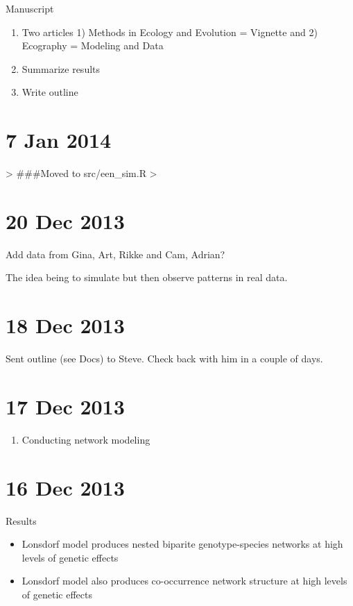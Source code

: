 \documentclass[12pt]{article}
\begin{document}
Manuscript
\begin{enumerate}
\item Two articles 1) Methods in Ecology and Evolution = Vignette and 2)
  Ecography = Modeling and Data
\item Summarize results
\item Write outline
\end{enumerate}


\section{7 Jan 2014}

\begin{Schunk}
\begin{Sinput}
> ###Moved to src/een_sim.R
> 
\end{Sinput}
\end{Schunk}

\section{20 Dec 2013}
Add data from Gina, Art, Rikke and Cam, Adrian?

The idea being to simulate but then observe patterns in real data.

\section{18 Dec 2013}
Sent outline (see Docs) to Steve. Check back with him in a couple of
days. 


\section{17 Dec 2013}

\begin{enumerate}
\item Conducting network modeling
\end{enumerate}

\section{16 Dec 2013}

Results
\begin{itemize}
\item Lonsdorf model produces nested biparite genotype-species networks at high
  levels of genetic effects
\item Lonsdorf model also produces co-occurrence network structure at
  high levels of genetic effects
\end{itemize}
\end{document}
